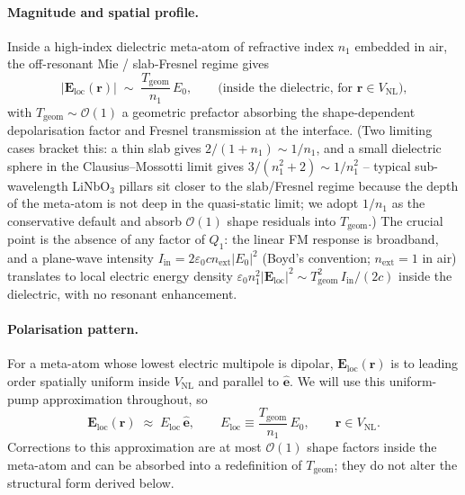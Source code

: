 \documentclass[11pt,a4paper]{article}
\newcommand{\eps}{\varepsilon}
\newcommand{\bvec}[1]{\mathbf{#1}}
\newcommand{\E}{\bvec{E}}
\newcommand{\ri}{\bvec{r}}
\newcommand{\Einc}{\E_{\text{loc}}}
\newcommand{\VNL}{V_{\text{NL}}}
\begin{document}
\paragraph{Magnitude and spatial profile.}
Inside a high-index dielectric meta-atom of refractive index $n_1$ embedded
in air, the off-resonant Mie / slab-Fresnel regime gives
\begin{equation}
  |\Einc(\ri)|\;\sim\;\frac{T_\text{geom}}{n_1}\,E_0,
  \qquad \text{(inside the dielectric, for }\ri\in\VNL\text{),}
  \label{eq:Eloc-magnitude}
\end{equation}
with $T_\text{geom}\sim\mathcal O(1)$ a geometric prefactor absorbing the
shape-dependent depolarisation factor and Fresnel transmission at the
interface.  (Two limiting cases bracket this: a thin slab gives
$2/(1+n_1)\sim 1/n_1$, and a small dielectric sphere in the
Clausius--Mossotti limit gives $3/(n_1^{2}+2)\sim 1/n_1^{2}$ -- typical
sub-wavelength LiNbO$_3$ pillars sit closer to the slab/Fresnel regime
because the depth of the meta-atom is not deep in the quasi-static limit;
we adopt $1/n_1$ as the conservative default and absorb $\mathcal O(1)$
shape residuals into $T_\text{geom}$.)  The crucial point is the absence
of any factor of $Q_1$: the linear FM response is broadband, and a
plane-wave intensity $I_\text{in}=2\eps_0 c n_\text{ext}|E_0|^{2}$
(Boyd's convention; $n_\text{ext}=1$ in air) translates to local electric
energy density
$\eps_0 n_1^{2}|\Einc|^{2}\sim T_\text{geom}^{2}\,I_\text{in}/(2c)$
inside the dielectric, with no resonant enhancement.

\paragraph{Polarisation pattern.}
For a meta-atom whose lowest electric multipole is dipolar, $\Einc(\ri)$ is
to leading order spatially uniform inside $\VNL$ and parallel to
$\hat{\bm e}$.  We will use this uniform-pump approximation throughout, so
\begin{equation}
  \Einc(\ri)\;\approx\;E_\text{loc}\,\hat{\bm e},
  \qquad
  E_\text{loc}\equiv \frac{T_\text{geom}}{n_1}\,E_0,
  \qquad \ri\in\VNL.
  \label{eq:Eloc-uniform}
\end{equation}
Corrections to this approximation are at most $\mathcal O(1)$ shape factors
inside the meta-atom and can be absorbed into a redefinition of
$T_\text{geom}$; they do not alter the structural form derived below.

\end{document}
